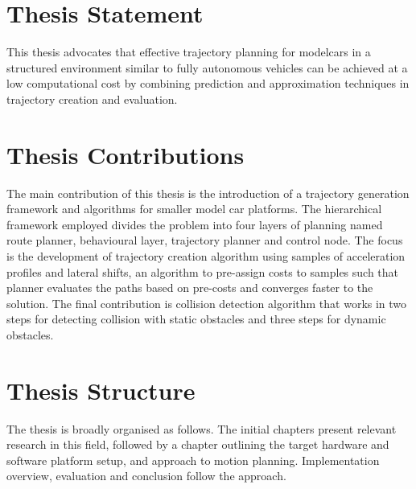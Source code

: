 

\section{Thesis Statement}

This thesis advocates that effective trajectory planning for modelcars in a structured environment similar to fully autonomous vehicles can be achieved at a low computational cost by combining prediction and approximation techniques in trajectory creation and evaluation.

\section{Thesis Contributions}

The main contribution of this thesis is the introduction of a trajectory generation framework and algorithms for smaller model car platforms. The hierarchical framework employed divides the problem into four layers of planning named route planner, behavioural layer, trajectory planner and control node. The focus is the development of trajectory creation algorithm using samples of acceleration profiles and lateral shifts, an algorithm to pre-assign costs to samples such that planner evaluates the paths based on pre-costs and converges faster to the solution. The final contribution is collision detection algorithm that works in two steps for detecting collision with static obstacles and three steps for dynamic obstacles. 

\section{Thesis Structure}


The thesis is broadly organised as follows. The initial chapters present relevant research in this field, followed by a chapter outlining the target hardware and software platform setup, and approach to motion planning. Implementation overview, evaluation and conclusion follow the approach.

